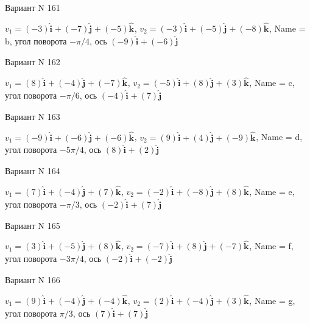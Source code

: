 \documentclass[11pt]{report}
\begin{document}
Вариант N 161

$v_1 = \left(-3\right)\mathbf{\hat{i}_{}} + \left(-7\right)\mathbf{\hat{j}_{}} + \left(-5\right)\mathbf{\hat{k}_{}}$, $v_2 = \left(-3\right)\mathbf{\hat{i}_{}} + \left(-5\right)\mathbf{\hat{j}_{}} + \left(-8\right)\mathbf{\hat{k}_{}}$, Name = b, угол поворота $- \pi / 4$, ось $\left(-9\right)\mathbf{\hat{i}_{}} + \left(-6\right)\mathbf{\hat{j}_{}}$

Вариант N 162

$v_1 = \left(8\right)\mathbf{\hat{i}_{}} + \left(-4\right)\mathbf{\hat{j}_{}} + \left(-7\right)\mathbf{\hat{k}_{}}$, $v_2 = \left(-5\right)\mathbf{\hat{i}_{}} + \left(8\right)\mathbf{\hat{j}_{}} + \left(3\right)\mathbf{\hat{k}_{}}$, Name = c, угол поворота $- \pi / 6$, ось $\left(-4\right)\mathbf{\hat{i}_{}} + \left(7\right)\mathbf{\hat{j}_{}}$

Вариант N 163

$v_1 = \left(-9\right)\mathbf{\hat{i}_{}} + \left(-6\right)\mathbf{\hat{j}_{}} + \left(-6\right)\mathbf{\hat{k}_{}}$, $v_2 = \left(9\right)\mathbf{\hat{i}_{}} + \left(4\right)\mathbf{\hat{j}_{}} + \left(-9\right)\mathbf{\hat{k}_{}}$, Name = d, угол поворота $- 5 \pi / 4$, ось $\left(8\right)\mathbf{\hat{i}_{}} + \left(2\right)\mathbf{\hat{j}_{}}$

Вариант N 164

$v_1 = \left(7\right)\mathbf{\hat{i}_{}} + \left(-4\right)\mathbf{\hat{j}_{}} + \left(7\right)\mathbf{\hat{k}_{}}$, $v_2 = \left(-2\right)\mathbf{\hat{i}_{}} + \left(-8\right)\mathbf{\hat{j}_{}} + \left(8\right)\mathbf{\hat{k}_{}}$, Name = e, угол поворота $- \pi / 3$, ось $\left(-2\right)\mathbf{\hat{i}_{}} + \left(7\right)\mathbf{\hat{j}_{}}$

Вариант N 165

$v_1 = \left(3\right)\mathbf{\hat{i}_{}} + \left(-5\right)\mathbf{\hat{j}_{}} + \left(8\right)\mathbf{\hat{k}_{}}$, $v_2 = \left(-7\right)\mathbf{\hat{i}_{}} + \left(8\right)\mathbf{\hat{j}_{}} + \left(-7\right)\mathbf{\hat{k}_{}}$, Name = f, угол поворота $- 3 \pi / 4$, ось $\left(-2\right)\mathbf{\hat{i}_{}} + \left(-2\right)\mathbf{\hat{j}_{}}$

Вариант N 166

$v_1 = \left(9\right)\mathbf{\hat{i}_{}} + \left(-4\right)\mathbf{\hat{j}_{}} + \left(-4\right)\mathbf{\hat{k}_{}}$, $v_2 = \left(2\right)\mathbf{\hat{i}_{}} + \left(-4\right)\mathbf{\hat{j}_{}} + \left(3\right)\mathbf{\hat{k}_{}}$, Name = g, угол поворота $\pi / 3$, ось $\left(7\right)\mathbf{\hat{i}_{}} + \left(7\right)\mathbf{\hat{j}_{}}$
\end{document}
